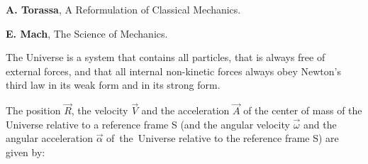 \documentclass[10pt]{article}
\begin{document}
\par \bigskip\smallskip \noindent \textbf{A. Torassa}, A Reformulation of Classical Mechanics.

\par \bigskip\smallskip \noindent \textbf{E. Mach}, The Science of Mechanics.

\newpage

\par {}

\par {}\hypertarget{p2a1}{}

\par \bigskip \noindent The Universe is a system that contains all particles, that is always free of external forces, and that all internal non-kinetic forces always obey Newton's third law in its weak form and in its strong form.

\par \bigskip \noindent The position ${\vec{\mathit{R}}}$, the velocity ${\vec{\mathit{V}}}$ and the acceleration ${\vec{\mathit{A}}}$ of the center of mass of the Universe relative to a reference frame S (and the angular velocity ${\vec{\omega}}$ and the angular acceleration ${\vec{\alpha}}$ \hbox {of the Universe} relative to the reference frame S) are given by:
\end{document}
